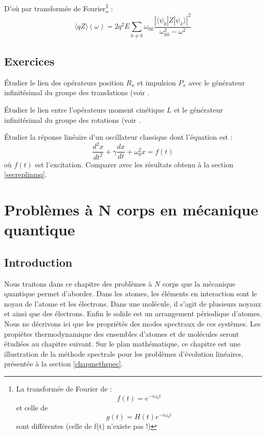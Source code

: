 \documentclass[12pt]{book}
\begin{document}
D'o\`u par transform\'ee de Fourier\footnote{La transform\'ee de
Fourier de :
\begin{equation}
f(t)=e^{-i\omega_0t}
\end{equation}
et celle de 
\begin{equation}
g(t)=H(t)e^{-i\omega_0t}
\end{equation}
sont diff\'erentes (celle de f(t) n'existe pas !\cite{ma:distr:Petit91})
}%
 :
\begin{equation}
\langle qZ\rangle (\omega)=2q^2E\sum_{k\neq 0}\omega_{0k}\frac{| \langle \psi_0|Z|\psi_k\rangle |^2}{\omega_{k0}^2-\omega^2}
\end{equation}


\section{Exercices}
\begin{exo}
\'Etudier le lien des op\'erateurs position $R_x$ et impulsion $P_x$ avec le
g\'en\'erateur infinit\'esimal du groupe des translations (voir
\cite{ma:equad:Dautray5}. 
\end{exo}

\begin{exo}
\'Etudier le lien entre l'op\'erateurs moment cin\'etique $L$ et le
g\'en\'erateur infinit\'esimal du groupe des rotations (voir
\cite{ma:equad:Dautray5}.
\end{exo}

\begin{exo}
\'Etudier la r\'eponse lin\'eaire d'un oscillateur classique dont l'\'equation
est :
\begin{equation}
\frac{d^{2}x}{dt^{2}}+\gamma \frac{dx}{dt}+\omega_{0}^{2}x=f(t)
\end{equation}
o\`u $f(t)$ est l'excitation.
Comparer avec les r\'esultats obtenu \`a la section \ref{secreplinmq}.
\end{exo}

\chapter{Probl\`emes \`a N corps en m\'ecanique
quantique}\label{chapproncorps} 
\section{Introduction}
Nous traitons dans ce chapitre des probl\`emes \`a $N$ corps que la
m\'ecanique quantique permet d'aborder. Dans les atomes, les
\'el\'ements en interaction sont le noyau de l'atome et les \'electrons.
Dans une mol\'ecule, il s'agit de plusieurs noyaux et ainsi que des
\'electrons. Enfin le solide est un arrangement p\'eriodique d'atomes.
Nous ne d\'ecrivons ici que les propri\'et\'es des modes spectraux de
ces syst\`emes. Les propi\'etes thermodynamique des ensembles d'atomes
et de mol\'ecules seront \'etudi\'ees au chapitre suivant.
Sur le plan math\'ematique, ce chapitre est une illustration de la m\'ethode
spectrale pour les probl\`emes d'\'evolution lin\'eaires, pr\'esent\'ee \`a la
section \ref{chapmethspec}.
\end{document}
